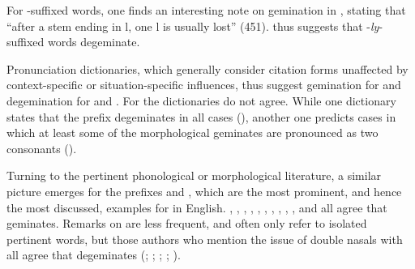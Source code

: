   For -suffixed words, one finds an interesting note on gemination in \cite{Wells.2008}, stating that ``after a stem ending in l, one l is usually lost'' (451). \cite{Wells.2008} thus suggests that \hbox{-}\textit{ly}-suffixed words {degeminate}.

 
 Pronunciation dictionaries, which generally consider citation forms unaffected by context-specific or situation-specific influences, thus suggest gemination for  and {degemination} for  and . For  the dictionaries do not agree. While one dictionary states that the prefix {degeminates} in all cases (\citealt{Wells.2008}), another one predicts cases in which at least some of the  morphological geminates are pronounced as two consonants (\citealt{Roach.2011}).
 
 
Turning to the pertinent phonological or morphological literature, a similar picture emerges for the prefixes  and , which are the most prominent, and hence the most discussed, examples for  in English. \citet[141]{Wijk.1966}, \citet[255]{OConnor.1973}, \citet[18]{Mohanan.1986}, \citet[119ff.]{Borowsky.1986}, \citet[111]{Catford.1988}, \citet[106]{Kreidler.1989}, \citet[251]{Ladefoged.1993}, \citet[18]{Harris.1994}, \citet[22]{Spencer.1996}, \citet[1055f.]{CohenGoldberg.2013}, and \citet{Cruttenden.2014} all agree that  geminates. Remarks on  are less frequent, and often only refer to isolated pertinent words, but those authors who mention the issue of double nasals with  all agree that  {degeminates} (\citealt[251]{Ladefoged.1993}; \citealt[18]{Mohanan.1986}; \citealt[18ff.]{Harris.1994}; \citealt[248]{Cruttenden.2014}; \citealt[1055f.]{CohenGoldberg.2013}).

